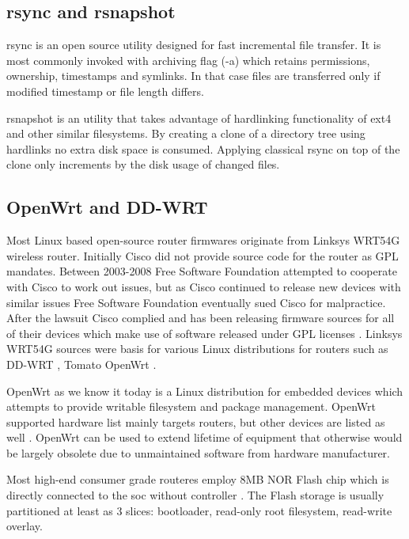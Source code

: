 \documentclass[a4paper,11pt]{kth-mag}
\begin{document}
\subsection{rsync and rsnapshot}

rsync is an open source utility designed for
fast incremental file transfer.
It is most commonly invoked with archiving flag (-a) which
retains permissions, ownership, timestamps and symlinks.
In that case files are transferred only if
modified timestamp or file length differs.

rsnapshot is an utility that takes advantage of hardlinking
functionality of \acrshort{ext4} and other similar filesystems.
By creating a clone of a directory tree using hardlinks no
extra disk space is consumed. Applying classical rsync on top of
the clone only increments by the disk usage of changed files.


\subsection{OpenWrt and DD-WRT}

Most Linux based open-source router firmwares originate from
Linksys WRT54G wireless router.
Initially Cisco did not provide source code for the router as GPL mandates.
Between 2003-2008 Free Software Foundation attempted to cooperate
with Cisco to work out issues, but as Cisco continued to release
new devices with similar issues Free Software Foundation eventually
sued Cisco for malpractice.
After the lawsuit Cisco complied and has been releasing firmware
sources for all of their devices which make use of software
released under GPL licenses
\cite{fsf-vs-cisco}.
Linksys WRT54G sources were basis for various Linux distributions for routers such as
DD-WRT \cite{dd-wrt},
Tomato \cite{tomato}
OpenWrt \cite{openwrt}.

OpenWrt as we know it today is a Linux distribution for embedded devices
which attempts to provide writable filesystem and package management.
OpenWrt supported hardware list mainly targets routers, but other devices are
listed as well \cite{openwrt-toh}. OpenWrt can be used to
extend lifetime of equipment that otherwise would be largely obsolete due
to unmaintained software from hardware manufacturer.

Most high-end consumer grade routeres employ 8MB NOR Flash chip which is
directly connected to the \acrshort{soc} without controller
\cite{openwrt-flash-layout}.
The Flash storage is usually partitioned at least as 3 slices:
bootloader, read-only root filesystem, read-write overlay.
\end{document}
